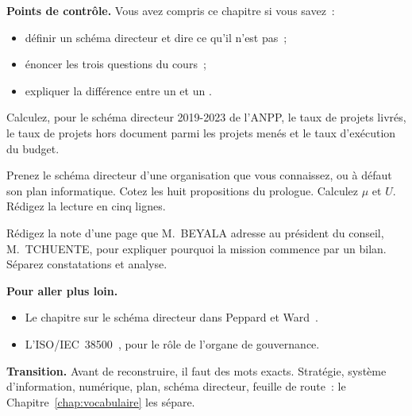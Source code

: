 \begin{boxinfo}
\textbf{Points de contrôle.} Vous avez compris ce chapitre si vous savez~:
\begin{itemize}
    \item définir un schéma directeur et dire ce qu'il n'est pas~;
    \item énoncer les trois questions du cours~;
    \item expliquer la différence entre un \NON{} et un \NEK{}.
\end{itemize}
\end{boxinfo}

\begin{boxexo}[title={\ding{45}\quad Exercice~P.1. Le bilan en chiffres \niveaubase}]
Calculez, pour le schéma directeur 2019-2023 de l'ANPP, le taux de projets livrés, le taux de projets hors document parmi les projets menés et le taux d'exécution du budget.
\end{boxexo}

\begin{boxexo}[title={\ding{45}\quad Exercice~P.2. Coter votre organisation \niveaumoyen}]
Prenez le schéma directeur d'une organisation que vous connaissez, ou à défaut son plan informatique. Cotez les huit propositions du prologue. Calculez $\mu$ et $U$. Rédigez la lecture en cinq lignes.
\end{boxexo}

\begin{boxexo}[title={\ding{45}\quad Exercice~P.3. La lettre au conseil \niveauexpert}]
Rédigez la note d'une page que M.~BEYALA adresse au président du conseil, M.~TCHUENTE, pour expliquer pourquoi la mission commence par un bilan. Séparez constatations et analyse.
\end{boxexo}

\bigskip

\begin{boxinfo}
\textbf{Pour aller plus loin.}
\begin{itemize}
    \item Le chapitre sur le schéma directeur dans Peppard et Ward~\cite{wardpeppard2016}.
    \item L'ISO/IEC~38500~\cite{iso38500}, pour le rôle de l'organe de gouvernance.
\end{itemize}
\end{boxinfo}

\begin{boxinfo}
\textbf{Transition.} Avant de reconstruire, il faut des mots exacts. Stratégie, système d'information, numérique, plan, schéma directeur, feuille de route~: le Chapitre~\ref{chap:vocabulaire} les sépare.
\end{boxinfo}
